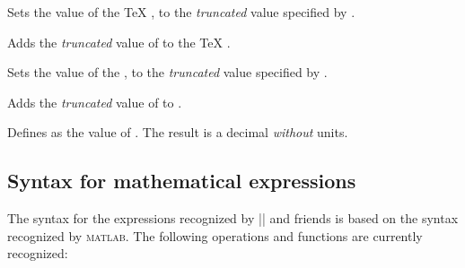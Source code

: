 \begin{command}{\pgfmathsetcount{}}
  Sets the value of the \TeX{} , to the 
  \emph{truncated} value specified by . 
\end{command}

\begin{command}{\pgfmathaddtocount{}}
  Adds the \emph{truncated} value  of  to the \TeX{} 
  .
\end{command}

\begin{command}{\pgfmathsetcounter{}}
  Sets the value of the , to the \emph{truncated} value 
  specified by . 
\end{command}

\begin{command}{\pgfmathaddtocounter{}}
  Adds the \emph{truncated} value  of  to 
  .
\end{command}


\begin{command}{\pgfmathsetmacro{}}
  Defines  as the  value of . The result
  is a decimal \emph{without} units.
\end{command}



\subsection{Syntax for mathematical expressions}

\label{pgfmath-syntax}

The syntax for the expressions recognized by |\pgfmathparse| and
friends is based on the syntax recognized by \textsc{matlab}. The
following operations and functions are currently recognized:

